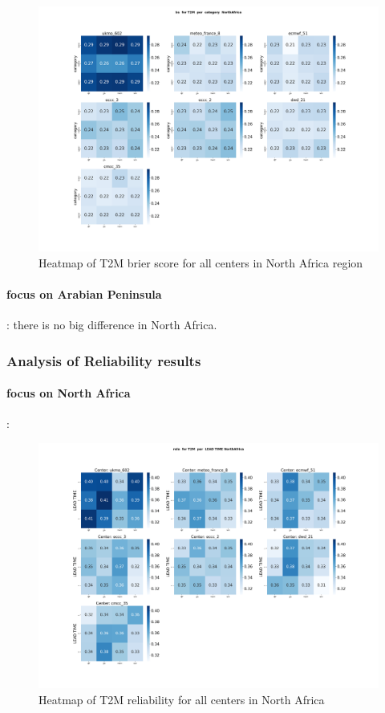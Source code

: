 \begin{figure}[H]
\includegraphics[scale=0.3]{plots/prob/bs/bs_T2M_category_NorthAfrica.png}

\caption{Heatmap of T2M  brier score for all centers in North Africa region}
\end{figure}





\vspace{1.5cm}
\paragraph{focus on Arabian Peninsula}:
there is no big difference in North Africa.
\subsubsection{Analysis of Reliability results}
\paragraph{focus on North Africa}:
\begin{figure}[H]
\includegraphics[scale=0.3]{plots/prob/rela/rela_T2M_NorthAfrica.png}

\caption{Heatmap of T2M  reliability  for all centers in North Africa}
\end{figure}


